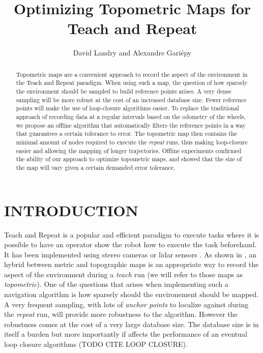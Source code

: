 \documentclass[letterpaper,10 pt,conference]{ieeeconf}
\title{\LARGE \bf
  Optimizing Topometric Maps for Teach and Repeat
}
\author{David Landry and Alexandre Gari\'epy}
\begin{document}
\maketitle
\thispagestyle{empty}
\pagestyle{empty}


\begin{abstract} Topometric maps are a convenient approach to record the aspect of the environment
in the Teach and Repeat paradigm. When using such a map, the question of how sparsely the
environment should be sampled to build reference points arises. A very dense sampling will be more
robust at the cost of an increased database size. Fewer reference points will make the use of
loop-closure algorithms easier. To replace the traditional approach of recording data at a regular
intervals based on the odometry of the wheels, we propose an offline algorithm that automatically
filters the reference points in a way that guarantees a certain tolerance to error. The topometric
map then contains the minimal amount of nodes required to execute the \textit{repeat} runs, thus
making loop-closure easier and allowing the mapping of longer trajectories. Offline experiments
confirmed the ability of our approach to optimize topometric maps, and showed that the size of the
map will vary given a certain demanded error tolerance.
\end{abstract}

\section{INTRODUCTION}

Teach and Repeat is a popular and efficient paradigm to execute tasks where it is possible to have
an operator show the robot how to execute the task beforehand. It has been implemented using stereo
cameras \cite{Furgale10} or lidar sensors \cite{Sprunk13}. As shown in \cite{Furgale10}, an hybrid
between metric and topographic maps is an appropriate way to record the aspect of the environment
during a \textit{teach} run (we will refer to those maps as \textit{topometric}). One of the
questions that arises when implementing such a navigation algorithm is how sparsely should the
environement should be mapped. A very frequent sampling, with lots of \textit{anchor points} to
localize against during the \textit{repeat} run, will provide more robustness to the
algorithm. However the robustness comes at the cost of a very large database size. The database size
is in itself a burden but more importantly if affects the performance of an eventual loop closure
algorithms (TODO CITE LOOP CLOSURE).
\end{document}
